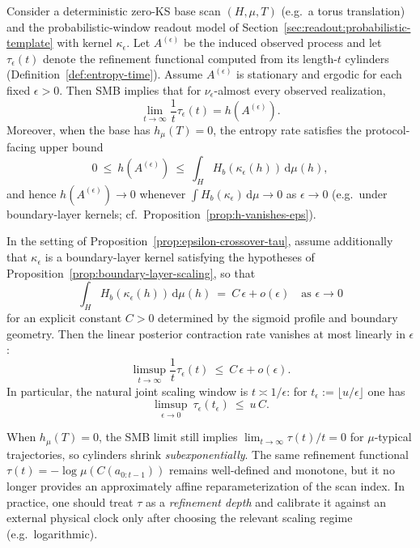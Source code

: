 \begin{proposition}\label{prop:epsilon-crossover-tau}
Consider a deterministic zero-KS base scan $(H,\mu,T)$ (e.g.\ a torus translation) and the probabilistic-window readout model of Section~\ref{sec:readout:probabilistic-template} with kernel $\kappa_\epsilon$.
Let $A^{(\epsilon)}$ be the induced observed process and let $\tau_\epsilon(t)$ denote the refinement functional computed from its length-$t$ cylinders (Definition~\ref{def:entropy-time}).
Assume $A^{(\epsilon)}$ is stationary and ergodic for each fixed $\epsilon>0$.
Then SMB implies that for $\nu_\epsilon$-almost every observed realization,
\[
\lim_{t\to\infty}\frac{1}{t}\tau_\epsilon(t)=h\!\left(A^{(\epsilon)}\right).
\]
Moreover, when the base has $h_\mu(T)=0$, the entropy rate satisfies the protocol-facing upper bound
\[
0\ \le\ h\!\left(A^{(\epsilon)}\right)\ \le\ \int_H H_b(\kappa_\epsilon(h))\,\mathrm{d}\mu(h),
\]
and hence $h(A^{(\epsilon)})\to 0$ whenever $\int H_b(\kappa_\epsilon)\,\mathrm{d}\mu\to 0$ as $\epsilon\to 0$ (e.g.\ under boundary-layer kernels; cf.\ Proposition~\ref{prop:h-vanishes-eps}).
\end{proposition}

\begin{corollary}[A scaling law: $\tau_\epsilon(t)=O(\epsilon t)$ under boundary layers]\label{cor:tau-eps-scaling}
In the setting of Proposition~\ref{prop:epsilon-crossover-tau}, assume additionally that $\kappa_\epsilon$ is a boundary-layer kernel satisfying the hypotheses of Proposition~\ref{prop:boundary-layer-scaling}, so that
\[
\int_H H_b(\kappa_\epsilon(h))\,\mathrm{d}\mu(h)\ =\ C\,\epsilon+o(\epsilon)
\quad\text{as }\epsilon\to 0
\]
for an explicit constant $C>0$ determined by the sigmoid profile and boundary geometry.
Then the linear posterior contraction rate vanishes at most linearly in $\epsilon$:
\[
\limsup_{t\to\infty}\frac{1}{t}\tau_\epsilon(t)\ \le\ C\,\epsilon+o(\epsilon).
\]
In particular, the natural joint scaling window is $t\asymp 1/\epsilon$: for $t_\epsilon:=\lfloor u/\epsilon\rfloor$ one has
\[
\limsup_{\epsilon\to 0}\ \tau_\epsilon(t_\epsilon)\ \le\ u\,C.
\]
\end{corollary}

\begin{remark}[What ``time'' looks like at $h_\mu(T)=0$]\label{rem:time-zero-ks}
When $h_\mu(T)=0$, the SMB limit still implies $\lim_{t\to\infty}\tau(t)/t=0$ for $\mu$-typical trajectories, so cylinders shrink \emph{subexponentially}. The same refinement functional $\tau(t)=-\log\mu(C(a_{0:t-1}))$ remains well-defined and monotone, but it no longer provides an approximately affine reparameterization of the scan index. In practice, one should treat $\tau$ as a \emph{refinement depth} and calibrate it against an external physical clock only after choosing the relevant scaling regime (e.g.\ logarithmic).
\end{remark}

